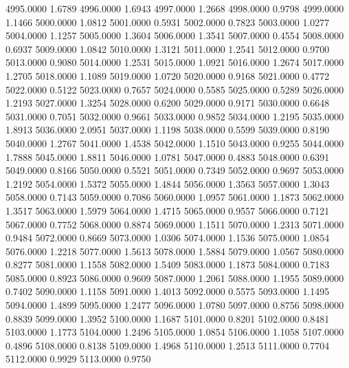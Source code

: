4995.0000      1.6789
4996.0000      1.6943
4997.0000      1.2668
4998.0000      0.9798
4999.0000      1.1466
5000.0000      1.0812
5001.0000      0.5931
5002.0000      0.7823
5003.0000      1.0277
5004.0000      1.1257
5005.0000      1.3604
5006.0000      1.3541
5007.0000      0.4554
5008.0000      0.6937
5009.0000      1.0842
5010.0000      1.3121
5011.0000      1.2541
5012.0000      0.9700
5013.0000      0.9080
5014.0000      1.2531
5015.0000      1.0921
5016.0000      1.2674
5017.0000      1.2705
5018.0000      1.1089
5019.0000      1.0720
5020.0000      0.9168
5021.0000      0.4772
5022.0000      0.5122
5023.0000      0.7657
5024.0000      0.5585
5025.0000      0.5289
5026.0000      1.2193
5027.0000      1.3254
5028.0000      0.6200
5029.0000      0.9171
5030.0000      0.6648
5031.0000      0.7051
5032.0000      0.9661
5033.0000      0.9852
5034.0000      1.2195
5035.0000      1.8913
5036.0000      2.0951
5037.0000      1.1198
5038.0000      0.5599
5039.0000      0.8190
5040.0000      1.2767
5041.0000      1.4538
5042.0000      1.1510
5043.0000      0.9255
5044.0000      1.7888
5045.0000      1.8811
5046.0000      1.0781
5047.0000      0.4883
5048.0000      0.6391
5049.0000      0.8166
5050.0000      0.5521
5051.0000      0.7349
5052.0000      0.9697
5053.0000      1.2192
5054.0000      1.5372
5055.0000      1.4844
5056.0000      1.3563
5057.0000      1.3043
5058.0000      0.7143
5059.0000      0.7086
5060.0000      1.0957
5061.0000      1.1873
5062.0000      1.3517
5063.0000      1.5979
5064.0000      1.4715
5065.0000      0.9557
5066.0000      0.7121
5067.0000      0.7752
5068.0000      0.8874
5069.0000      1.1511
5070.0000      1.2313
5071.0000      0.9484
5072.0000      0.8669
5073.0000      1.0306
5074.0000      1.1536
5075.0000      1.0854
5076.0000      1.2218
5077.0000      1.5613
5078.0000      1.5884
5079.0000      1.0567
5080.0000      0.8277
5081.0000      1.1558
5082.0000      1.5409
5083.0000      1.1873
5084.0000      0.7183
5085.0000      0.8923
5086.0000      0.9609
5087.0000      1.2061
5088.0000      1.1955
5089.0000      0.7402
5090.0000      1.1158
5091.0000      1.4013
5092.0000      0.5575
5093.0000      1.1495
5094.0000      1.4899
5095.0000      1.2477
5096.0000      1.0780
5097.0000      0.8756
5098.0000      0.8839
5099.0000      1.3952
5100.0000      1.1687
5101.0000      0.8201
5102.0000      0.8481
5103.0000      1.1773
5104.0000      1.2496
5105.0000      1.0854
5106.0000      1.1058
5107.0000      0.4896
5108.0000      0.8138
5109.0000      1.4968
5110.0000      1.2513
5111.0000      0.7704
5112.0000      0.9929
5113.0000      0.9750
